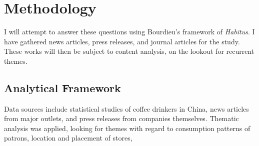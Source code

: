 \section{Methodology}\label{sec:methodology}

I will attempt to answer these questions using Bourdieu's framework of
\emph{Habitus}. I have gathered news articles, press releases, and journal articles
for the study. These works will then be subject to content analysis, on the
lookout for recurrent themes.

\subsection{Analytical Framework}\label{subs:analyticf}

Data sources include statistical studies of coffee drinkers in China,
news articles from major outlets, and press releases from companies
themselves. Thematic analysis was applied, looking for themes with regard to
consumption patterns of patrons, location and placement of stores, 

